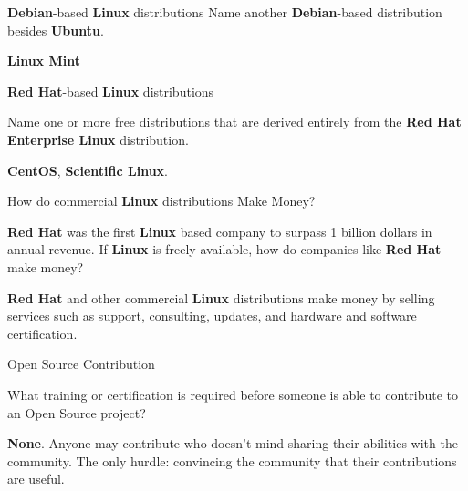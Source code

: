 \begin{Lab}
\begin{exe} {\textbf{Debian}-based \textbf{Linux} distributions}
   Name another \textbf{Debian}-based distribution besides
   \textbf{Ubuntu}.

   \begin{sol}

      \textbf{Linux Mint}
   \end{sol}
\end{exe}

\begin{exe} {\textbf{Red Hat}-based \textbf{Linux} distributions}

   Name one or more free distributions that are derived
   entirely from the \textbf{Red Hat Enterprise Linux}
   distribution.

   \begin{sol}

      \textbf{CentOS}, \textbf{Scientific Linux}.

   \end{sol}
\end{exe}

\begin{exe} {How do commercial \textbf{Linux} distributions Make Money?}

   \textbf{Red Hat} was the first \textbf{Linux} based
   company to surpass 1 billion dollars in annual revenue.
   If \textbf{Linux} is freely available, how do companies
   like \textbf{Red Hat} make money?

   \begin{sol}

      \textbf{Red Hat} and other commercial \textbf{Linux}
      distributions make money by selling services such as
      support, consulting, updates, and hardware and software
      certification.

   \end{sol}
\end{exe}

\begin{exe} {Open Source Contribution}

   What training or certification is required before
   someone is able to contribute to an Open Source project?

   \begin{sol}

      \textbf{None}.  Anyone may contribute who doesn't mind sharing
      their abilities with the community.  The only hurdle:
      convincing the community that their contributions are
      useful.

   \end{sol}
\end{exe}


\end{Lab}
